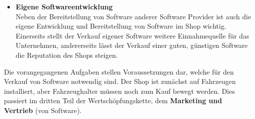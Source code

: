 \begin{itemize}
	\item[] \hspace{-0.6cm} \textbf{Eigene Softwareentwicklung}\\
	Neben der Bereitstellung von Software anderer Software Provider ist auch die eigene Entwicklung und Bereitstellung von Software im Shop wichtig. Einerseits stellt der Verkauf eigener Software weitere Einnahmequelle für das Unternehmen, andererseits lässt der Verkauf einer guten, günstigen Software die Reputation des Shops steigen. 
\end{itemize}
Die vorangegangenen Aufgaben stellen Voraussetzungen dar, welche für den Verkauf von Software notwendig sind. Der Shop ist zunächst auf Fahrzeugen installiert, aber Fahrzeughalter müssen noch zum Kauf bewegt werden. Dies passiert im dritten Teil der Wertschöpfungskette, dem \textbf{Marketing und Vertrieb} (von Software).
